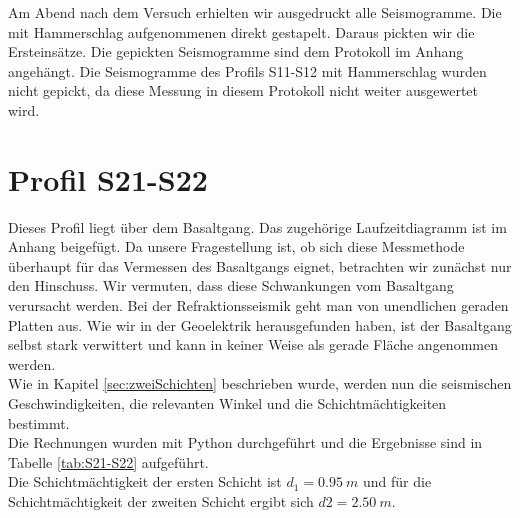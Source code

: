 
Am Abend nach dem Versuch erhielten wir ausgedruckt alle Seismogramme. Die mit Hammerschlag aufgenommenen direkt gestapelt. Daraus pickten wir die Ersteinsätze. Die gepickten Seismogramme sind dem Protokoll im Anhang angehängt. Die Seismogramme des Profils S11-S12 mit Hammerschlag wurden nicht gepickt, da diese Messung in diesem Protokoll nicht weiter ausgewertet wird.


\section{Profil S21-S22 }

Dieses Profil liegt über dem Basaltgang. Das zugehörige Laufzeitdiagramm ist im Anhang beigefügt. Da unsere Fragestellung ist, ob sich diese Messmethode überhaupt für das Vermessen des Basaltgangs eignet, betrachten wir zunächst nur den Hinschuss. 
Wir vermuten, dass diese Schwankungen vom Basaltgang verursacht werden. Bei der Refraktionsseismik geht man von unendlichen geraden Platten aus. Wie wir in der Geoelektrik herausgefunden haben, ist der Basaltgang selbst stark verwittert und kann in keiner Weise als gerade Fläche angenommen werden.\\


Wie in Kapitel \ref{sec:zweiSchichten} beschrieben wurde, werden nun die seismischen Geschwindigkeiten, die relevanten Winkel und die Schichtmächtigkeiten bestimmt.\\
Die Rechnungen wurden mit Python durchgeführt und die Ergebnisse sind in Tabelle \ref{tab:S21-S22} aufgeführt.\\

Die Schichtmächtigkeit der ersten Schicht ist $d_1 =\SI{0.95}{m}$ und für die Schichtmächtigkeit der zweiten Schicht ergibt sich $d2 = \SI{2.50}{m}$.\\

